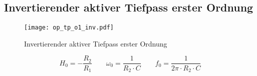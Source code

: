 



\subsection{Invertierender aktiver Tiefpass erster Ordnung}
\begin{figure}[h!]
	\centering
	\texttt{[image: op\_tp\_o1\_inv.pdf]}
	\caption{Invertierender aktiver Tiefpass erster Ordnung}
	\label{sch:op-tp-o1-inv}
\end{figure}
\[ H_0 = - \frac{R_2}{R_1} \qquad
\omega_0 = \frac{1}{R_2 \cdot C} \qquad
f_0 = \frac{1}{2 \pi \cdot R_2 \cdot C} \]